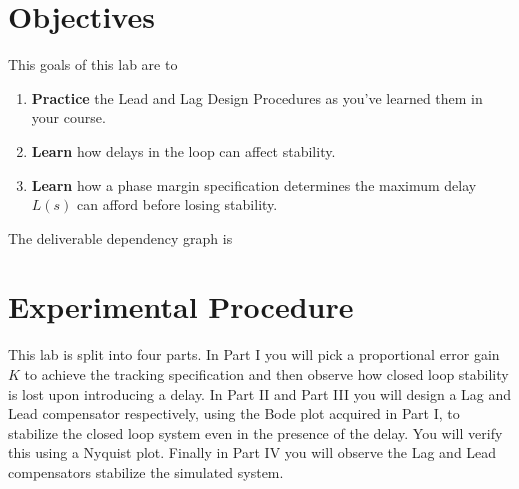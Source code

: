 \section{Objectives}\label{Lab:4:Objectives}
This goals of this lab are to
\begin{enumerate}[label=(\arabic*)]
  \item{
    \textbf{Practice} the Lead and Lag Design Procedures as you've learned them in your course.
  }
  \item{
    \textbf{Learn} how delays in the loop can affect stability.
  }
  \item{
    \textbf{Learn} how a phase margin specification determines the maximum delay \(L(s)\) can afford before losing stability.
  }
\end{enumerate}
The deliverable dependency graph is
\begin{center}
\end{center}

\section{Experimental Procedure}\label{Lab:4:Experiment}
This lab is split into four parts.
In Part I you will pick a proportional error gain \(K\) to achieve the tracking specification and then observe how closed loop stability is lost upon introducing a delay.
In Part II and Part III you will design a Lag and Lead compensator respectively, using the Bode plot acquired in Part I, to stabilize the closed loop system even in the presence of the delay.
You will verify this using a Nyquist plot.
Finally in Part IV you will observe the Lag and Lead compensators stabilize the simulated system.

